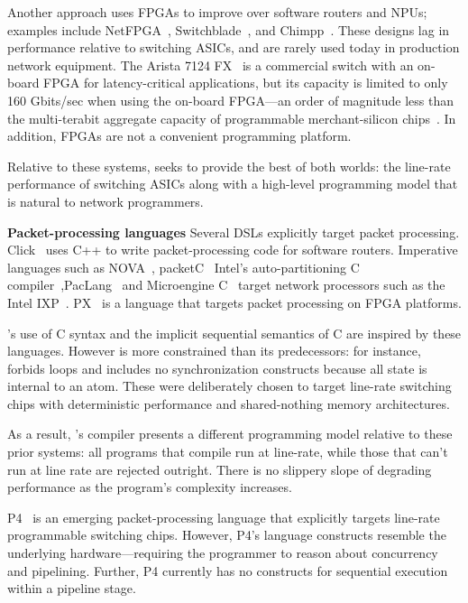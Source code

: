 Another approach uses FPGAs to improve over software routers and NPUs; examples
include NetFPGA~\cite{netfpga}, Switchblade~\cite{switchblade}, and
Chimpp~\cite{chimpp}. These designs lag in performance relative to switching
ASICs, and are rarely used today in production network equipment. The Arista
7124 FX~\cite{7124fx} is a commercial switch with an on-board FPGA for
latency-critical applications, but its capacity is limited to only 160
Gbits/sec when using the on-board FPGA---an order of magnitude less than the
multi-terabit aggregate capacity of programmable merchant-silicon
chips~\cite{xpliant}. In addition, FPGAs are not a convenient programming
platform.

Relative to these systems, \pktlanguage seeks to provide the best of both
worlds: the line-rate performance of switching ASICs along with a high-level
programming model that is natural to network programmers.

\textbf{Packet-processing languages}
Several DSLs explicitly target packet processing. Click~\cite{click} uses C++
to write packet-processing code for software routers. Imperative languages such
as NOVA~\cite{nova}, packetC~\cite{packetc} Intel's auto-partitioning C
compiler~\cite{intel_uiuc_pldi},PacLang~\cite{paclang_lang,
paclang_partitioner} and Microengine C~\cite{microenginec, intel_ixa} target
network processors such as the Intel IXP~\cite{ixp2800, ixp4xx}.  PX~\cite{PX}
is a language that targets packet processing on FPGA platforms.

\pktlanguage's use of C syntax and the implicit sequential semantics of C are
inspired by these languages. However \pktlanguage is more constrained than its
predecessors: for instance, \pktlanguage forbids loops and includes no
synchronization constructs because all state is internal to an atom. These were
deliberately chosen to target line-rate switching chips with deterministic
performance and shared-nothing memory architectures.

As a result, \pktlanguage's compiler presents a different programming model
relative to these prior systems: all \pktlanguage programs that compile run at
line-rate, while those that can't run at line rate are rejected outright. There
is no slippery slope of degrading performance as the program's complexity
increases.

P4~\cite{p4} is an emerging packet-processing language that explicitly targets
line-rate programmable switching chips. However, P4's language constructs
resemble the underlying hardware---requiring the programmer to reason about
concurrency and pipelining. Further, P4 currently has no constructs for
sequential execution within a pipeline stage.

